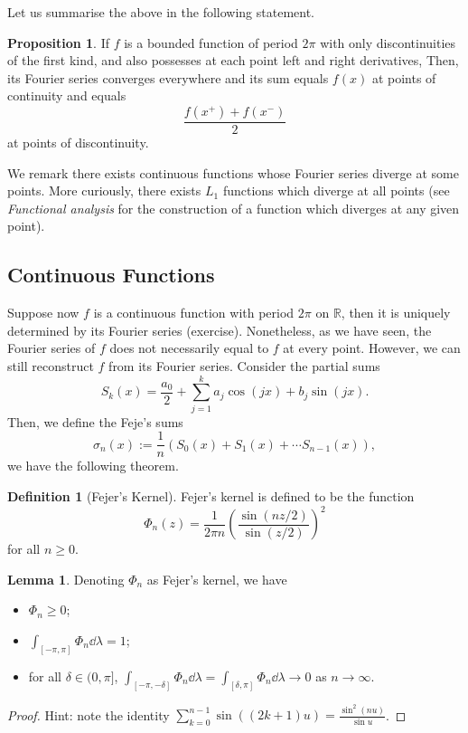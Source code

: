 \documentclass[]{article}
\theoremstyle{definition}
\theoremstyle{definition}
\newtheorem{definition}{Definition}[section]
\newtheorem{lemma}{Lemma}[section]
\newtheorem{proposition}{Proposition}[section]
\begin{document}
Let us summarise the above in the following statement.

\begin{proposition}
  If \(f\) is a bounded function of period \(2\pi\) with only 
  discontinuities of the first kind, and also possesses at each point left and right 
  derivatives, Then, its Fourier series converges everywhere and its sum equals 
  \(f(x)\) at points of continuity and equals 
  \[\frac{f(x^+) + f(x^-)}{2}\]
  at points of discontinuity.
\end{proposition}

We remark there exists continuous functions whose Fourier series diverge at some 
points. More curiously, there exists \(L_1\) functions which diverge at all points 
(see \textit{Functional analysis} for the construction of a function which diverges 
at any given point).

\subsection{Continuous Functions}

Suppose now \(f\) is a continuous function with period \(2\pi\) on \(\mathbb{R}\), 
then it is uniquely determined by its Fourier series (exercise). Nonetheless, as 
we have seen, the Fourier series of \(f\) does not necessarily equal to \(f\) 
at every point. However, we can still reconstruct \(f\) from its Fourier series. 
Consider the partial sums 
\[S_k(x) = \frac{a_0}{2} + \sum_{j = 1}^k a_j \cos (jx) + b_j \sin (jx).\]
Then, we define the Feje's sums 
\[\sigma_n(x) := \frac{1}{n}(S_0(x) + S_1(x) + \cdots S_{n - 1}(x)),\]
we have the following theorem.

\begin{definition}[Fejer's Kernel]
  Fejer's kernel is defined to be the function 
  \[\Phi_n(z) = \frac{1}{2\pi n}\left(\frac{\sin(nz / 2)}{\sin(z / 2)}\right)^2\]
  for all \(n \ge 0\).
\end{definition}

\begin{lemma}
  Denoting \(\Phi_n\) as Fejer's kernel, we have 
  \begin{itemize}
    \item \(\Phi_n \ge 0\);
    \item \(\int_{[-\pi, \pi]} \Phi_n \dd \lambda = 1\);
    \item for all \(\delta \in (0, \pi]\), 
      \(\int_{[-\pi, -\delta]} \Phi_n \dd \lambda = \int_{[\delta, \pi]} \Phi_n \dd \lambda \to 0\) as 
      \(n \to \infty\).
  \end{itemize}
\end{lemma}
\begin{proof}
  Hint: note the identity 
  \(\sum_{k = 0}^{n -1} \sin((2k + 1) u)= \frac{\sin^2(nu)}{\sin u}\).
\end{proof}
\end{document}
